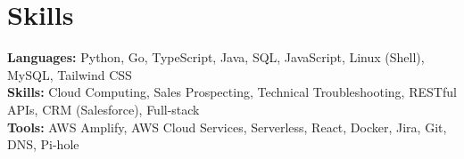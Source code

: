 \documentclass[11pt]{article}       %
\begin{document}

\vspace{-18.5pt}


\section*{Skills}
\textbf{Languages:} Python, Go, TypeScript, Java, SQL, JavaScript, Linux (Shell), MySQL, Tailwind CSS\\
\textbf{Skills:} Cloud Computing, Sales Prospecting, Technical Troubleshooting, RESTful APIs, CRM (Salesforce), Full-stack\\
\textbf{Tools:} AWS Amplify, AWS Cloud Services, Serverless, React, Docker, Jira, Git, DNS, Pi-hole\\

\vspace{-6.5pt}
\end{document}
